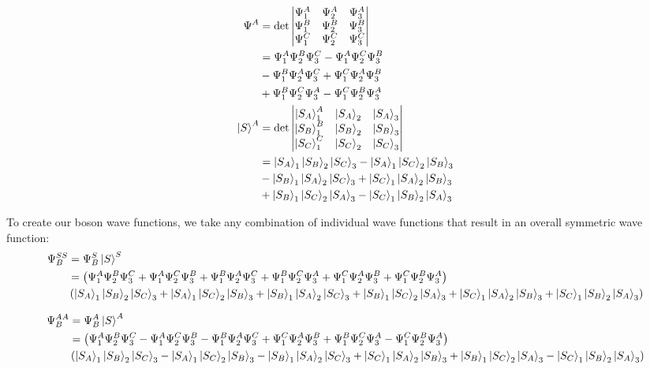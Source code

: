 \documentclass[10pt]{article} %
\begin{document}
\begin{align*}
  \Psi^{A} &= \det
  \begin{vmatrix}
    \Psi_1^A & \Psi_2^A & \Psi_3^A\\
    \Psi_1^B & \Psi_2^B & \Psi_3^B\\
    \Psi_1^C & \Psi_2^C & \Psi_3^C\\
  \end{vmatrix}\\
  &= \Psi_1^A\Psi_2^B\Psi_3^C - \Psi_1^A\Psi_2^C\Psi_3^B\\
  &- \Psi_1^B\Psi_2^A\Psi_3^C + \Psi_1^C\Psi_2^A\Psi_3^B\\
  &+ \Psi_1^B\Psi_2^C\Psi_3^A - \Psi_1^C\Psi_2^B\Psi_3^A\\
  \ket{S}^A &= \det
  \begin{vmatrix}
    \ket{S_A}_1^A & \ket{S_A}_2 & \ket{S_A}_3\\
    \ket{S_B}_1^B & \ket{S_B}_2 & \ket{S_B}_3\\
    \ket{S_C}_1^C & \ket{S_C}_2 & \ket{S_C}_3\\
  \end{vmatrix}\\
  &= \ket{S_A}_1\ket{S_B}_2\ket{S_C}_3 - \ket{S_A}_1\ket{S_C}_2\ket{S_B}_3\\
  &- \ket{S_B}_1\ket{S_A}_2\ket{S_C}_3 + \ket{S_C}_1\ket{S_A}_2\ket{S_B}_3\\
  &+ \ket{S_B}_1\ket{S_C}_2\ket{S_A}_3 - \ket{S_C}_1\ket{S_B}_2\ket{S_A}_3\\
\end{align*}

To create our boson wave functions, we take any combination of individual wave functions that result
in an overall symmetric wave function:\\

\begin{align*}
  \Psi_B^{SS} &= \Psi_B^S\ket{S}^S\\
  &= \left(\Psi_1^A\Psi_2^B\Psi_3^C + \Psi_1^A\Psi_2^C\Psi_3^B
  + \Psi_1^B\Psi_2^A\Psi_3^C + \Psi_1^B\Psi_2^C\Psi_3^A
  + \Psi_1^C\Psi_2^A\Psi_3^B + \Psi_1^C\Psi_2^B\Psi_3^A\right)\\
  &\left(\ket{S_A}_1\ket{S_B}_2\ket{S_C}_3 + \ket{S_A}_1\ket{S_C}_2\ket{S_B}_3
  + \ket{S_B}_1\ket{S_A}_2\ket{S_C}_3 + \ket{S_B}_1\ket{S_C}_2\ket{S_A}_3
  + \ket{S_C}_1\ket{S_A}_2\ket{S_B}_3 + \ket{S_C}_1\ket{S_B}_2\ket{S_A}_3\right)
\end{align*}

\begin{align*}
  \Psi_B^{AA} &= \Psi_B^A\ket{S}^A\\
  &= \left(\Psi_1^A\Psi_2^B\Psi_3^C - \Psi_1^A\Psi_2^C\Psi_3^B
  - \Psi_1^B\Psi_2^A\Psi_3^C + \Psi_1^C\Psi_2^A\Psi_3^B
  + \Psi_1^B\Psi_2^C\Psi_3^A - \Psi_1^C\Psi_2^B\Psi_3^A\right)\\
  &\left(\ket{S_A}_1\ket{S_B}_2\ket{S_C}_3 - \ket{S_A}_1\ket{S_C}_2\ket{S_B}_3
  - \ket{S_B}_1\ket{S_A}_2\ket{S_C}_3 + \ket{S_C}_1\ket{S_A}_2\ket{S_B}_3
  + \ket{S_B}_1\ket{S_C}_2\ket{S_A}_3 - \ket{S_C}_1\ket{S_B}_2\ket{S_A}_3\right)\\
\end{align*}
\end{document}
